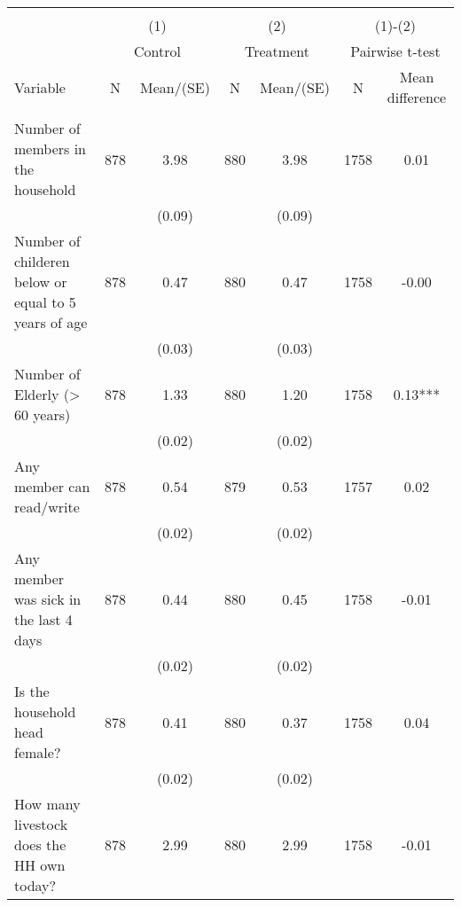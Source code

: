 
\begin{tabular}{@{\extracolsep{5pt}}lcccccc}
\\[-1.8ex]\hline \hline \\[-1.8ex]
 & \multicolumn{2}{c}{(1)}  & \multicolumn{2}{c}{(2)}  & \multicolumn{2}{c}{(1)-(2)} \\
 & \multicolumn{2}{c}{Control}  & \multicolumn{2}{c}{Treatment}  & \multicolumn{2}{c}{Pairwise t-test}  \\
Variable & N & Mean/(SE) & N & Mean/(SE) & N & Mean difference \\ \hline \\[-1.8ex] 
Number of members in the household   & 878    & 3.98    & 880    & 3.98    & 1758    & 0.01   \\
 &   & (0.09)  &   & (0.09)  &   &  \\ [1ex]
Number of childeren below or equal to 5 years of age   & 878    & 0.47    & 880    & 0.47    & 1758    & -0.00   \\
 &   & (0.03)  &   & (0.03)  &   &  \\ [1ex]
Number of Elderly (> 60 years)   & 878    & 1.33    & 880    & 1.20    & 1758    & 0.13***   \\
 &   & (0.02)  &   & (0.02)  &   &  \\ [1ex]
Any member can read/write   & 878    & 0.54    & 879    & 0.53    & 1757    & 0.02   \\
 &   & (0.02)  &   & (0.02)  &   &  \\ [1ex]
Any member was sick in the last 4 days   & 878    & 0.44    & 880    & 0.45    & 1758    & -0.01   \\
 &   & (0.02)  &   & (0.02)  &   &  \\ [1ex]
Is the household head female?   & 878    & 0.41    & 880    & 0.37    & 1758    & 0.04   \\
 &   & (0.02)  &   & (0.02)  &   &  \\ [1ex]
How many livestock does the HH own today?   & 878    & 2.99    & 880    & 2.99    & 1758    & -0.01   \\

\end{tabular}
